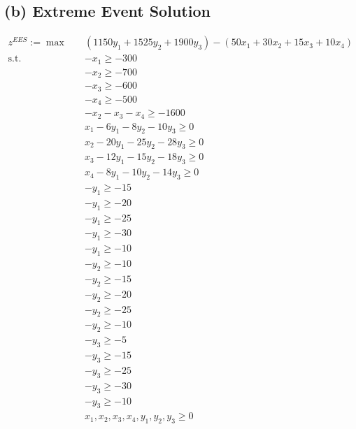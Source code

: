 \documentclass[7pt]{article}
\begin{document}
\subsection*{(b) Extreme Event Solution}
\vspace{-2em}
\begin{minipage}[t]{0.58\textwidth}
    \begin{align*}
        z^{EES} := \max \quad
         & \left(1150y_1 + 1525y_2 + 1900 y_3 \right)
        - \left(50 x_1 + 30 x_2 + 15 x_3 + 10 x_4 \right) \\
        \text{s.t.} \quad
         & -x_1 \geq -300                                 \\
         & -x_2 \geq -700                                 \\
         & -x_3 \geq -600                                 \\
         & -x_4 \geq -500                                 \\
         & -x_2 - x_3 - x_4 \geq -1600                    \\
         & x_1 - 6y_1 - 8y_2 - 10y_3 \geq 0               \\
         & x_2 - 20y_1 - 25y_2 - 28y_3 \geq 0             \\
         & x_3 - 12y_1 - 15y_2 - 18y_3 \geq 0             \\
         & x_4 - 8y_1 - 10y_2 - 14y_3 \geq 0              \\
         & -y_1 \geq -15                                  \\
         & -y_1 \geq -20                                  \\
         & -y_1 \geq -25                                  \\
         & -y_1 \geq -30                                  \\
         & -y_1 \geq -10                                  \\
         & -y_2 \geq -10                                  \\
         & -y_2 \geq -15                                  \\
         & -y_2 \geq -20                                  \\
         & -y_2 \geq -25                                  \\
         & -y_2 \geq -10                                  \\
         & -y_3 \geq -5                                   \\
         & -y_3 \geq -15                                  \\
         & -y_3 \geq -25                                  \\
         & -y_3 \geq -30                                  \\
         & -y_3 \geq -10                                  \\
         & x_1, x_2, x_3, x_4, y_1, y_2, y_3 \geq 0
    \end{align*}
\end{minipage}
\end{document}
